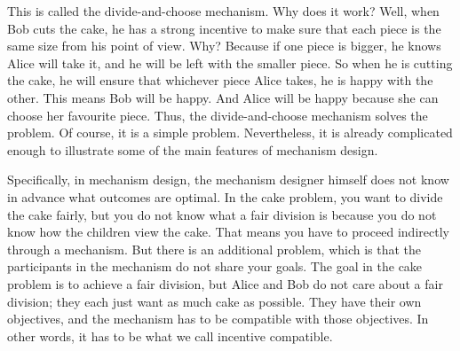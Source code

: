 \documentclass[12pt,a4paper]{article}
\newenvironment{original}{%
  \par\vspace{4pt}\noindent%
  \color{black}%
  \ignorespaces
}{%
  \par\vspace{2pt}%
}
\begin{document}
\begin{original}
This is called the divide-and-choose mechanism. Why does it work? Well, when Bob cuts the cake, he has a strong incentive to make sure that each piece is the same size from his point of view. Why? Because if one piece is bigger, he knows Alice will take it, and he will be left with the smaller piece. So when he is cutting the cake, he will ensure that whichever piece Alice takes, he is happy with the other. This means Bob will be happy. And Alice will be happy because she can choose her favourite piece. Thus, the divide-and-choose mechanism solves the problem. Of course, it is a simple problem. Nevertheless, it is already complicated enough to illustrate some of the main features of mechanism design.

Specifically, in mechanism design, the mechanism designer himself does not know in advance what outcomes are optimal. In the cake problem, you want to divide the cake fairly, but you do not know what a fair division is because you do not know how the children view the cake. That means you have to proceed indirectly through a mechanism. But there is an additional problem, which is that the participants in the mechanism do not share your goals. The goal in the cake problem is to achieve a fair division, but Alice and Bob do not care about a fair division; they each just want as much cake as possible. They have their own objectives, and the mechanism has to be compatible with those objectives. In other words, it has to be what we call incentive compatible.
\end{original}
\end{document}
